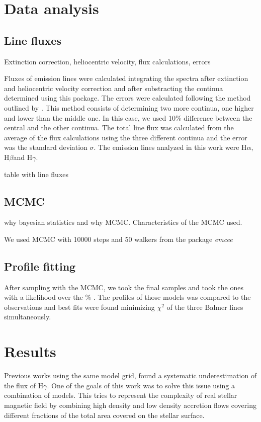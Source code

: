 \documentclass[twocolumn,linenumbers]{aastex631}
\newcommand{\halpha}{H$\alpha$}
\newcommand{\hbeta}{H$\beta$}
\newcommand{\hgamma}{H$\gamma$}
\begin{document}
\section{Data analysis}

\subsection{Line fluxes}

Extinction correction, heliocentric velocity, flux calculations, errors

Fluxes of emission lines were calculated integrating the spectra after extinction and heliocentric velocity correction and after substracting the continua determined using this package. The errors were calculated following the method outlined by \citet{alcala2014}. This method consists of determining two more continua, one higher and lower than the middle one. In this case, we used 10\% difference between the central and the other continua. The total line flux was calculated from the average of the flux calculations using the three different continua and the error was the standard deviation $\sigma$. The emission lines analyzed in this work were \halpha, \hbeta and \hgamma.

table with line fluxes


\subsection{MCMC}

why bayesian statistics and why MCMC. Characteristics of the MCMC used. 

We used MCMC with 10000 steps and 50 walkers from the package \textit{emcee}

\subsection{Profile fitting}

After sampling with the MCMC, we took the final samples and took the ones with a likelihood over the \% . The profiles of those models was compared to the observations and best fits were found minimizing $\chi^2$ of the three Balmer lines simultaneously.

\section{Results}

Previous works using the same model grid, found a systematic underestimation of the flux of \hgamma. One of the goals of this work was to solve this issue using a combination of models. This tries to represent the complexity of real stellar magnetic field by combining high density and low density accretion flows covering different fractions of the total area covered on the stellar surface.
\end{document}
